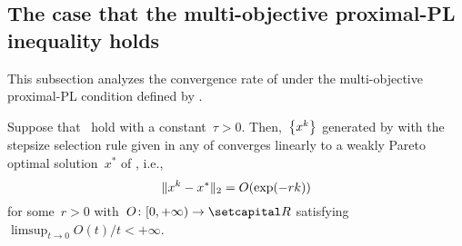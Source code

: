 \documentclass[../../main]{subfiles}
\begin{document}
\subsection{The case that the multi-objective proximal-PL inequality holds}
This subsection analyzes the convergence rate of  under the multi-objective proximal-PL condition defined by .

\begin{theorem} 
    Suppose that~ hold with a constant~$\tau > 0$.
    Then,~$\set*{x^k}$ generated by  with the stepsize selection rule given in any of  converges linearly to a weakly Pareto optimal solution~$x^*$ of , i.e.,
    \begin{equation}
        \norm{x^k - x^*}_2 = O(\exp (- r k)) 
    \end{equation}
    for some~$r > 0$ with~$O \colon [0, + \infty) \to \setR$ satisfying~$\limsup_{t \to 0} O(t) / t < + \infty$.
\end{theorem}
\end{document}
